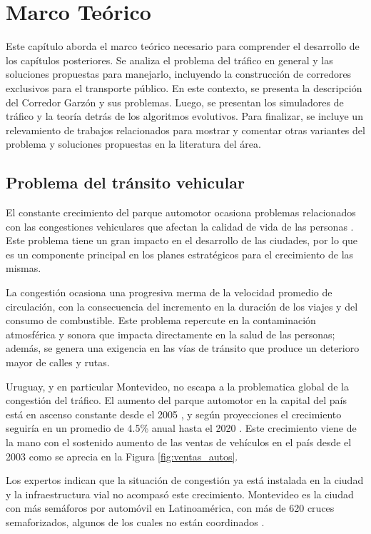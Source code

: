 \chapter{Marco Teórico}
Este capítulo aborda el marco teórico necesario para comprender el desarrollo de los capítulos posteriores. Se analiza el problema del tráfico en general y las soluciones propuestas para manejarlo, incluyendo la construcción de corredores exclusivos para el transporte público. En este contexto, se presenta la descripción del Corredor Garzón y sus problemas. Luego, se presentan los simuladores de tráfico y la teoría detrás de los algoritmos evolutivos. Para finalizar, se incluye un relevamiento de trabajos relacionados para mostrar y comentar otras variantes del problema y soluciones propuestas en la literatura del área.
\section{Problema del tránsito vehicular}

El constante crecimiento del parque automotor ocasiona problemas relacionados con las congestiones vehiculares que afectan la calidad de vida de las personas \citep{Cepal2003}. Este problema tiene un gran impacto en el desarrollo de las ciudades, por lo que es un componente principal en los planes estratégicos para el crecimiento de las mismas.

La congestión ocasiona una progresiva merma de la velocidad promedio de circulación, con la consecuencia del incremento en la duración de los viajes y del consumo de combustible. Este problema repercute en la contaminación atmosférica y sonora que impacta directamente en la salud de las personas; además, se genera una exigencia en las vías de tránsito que produce un deterioro mayor de calles y rutas.

Uruguay, y en particular Montevideo, no escapa a la problematica global de la congestión del tráfico. El aumento del parque automotor en la capital del país está en ascenso constante desde el 2005 \citep{INE2014}, y según proyecciones el crecimiento seguiría en un promedio de 4.5\% anual hasta el 2020 \citep{BBVA2013}. Este crecimiento viene de la mano con el sostenido aumento de las ventas de vehículos en el país desde el 2003 como se aprecia en la Figura \ref{fig:ventas_autos}.

Los expertos indican que la situación de congestión ya está instalada en la ciudad y la infraestructura vial no acompasó este crecimiento. Montevideo es la ciudad con más semáforos por automóvil en Latinoamérica, con más de 620 cruces semaforizados, algunos de los cuales no están coordinados \citep{Subrayado2013}.

